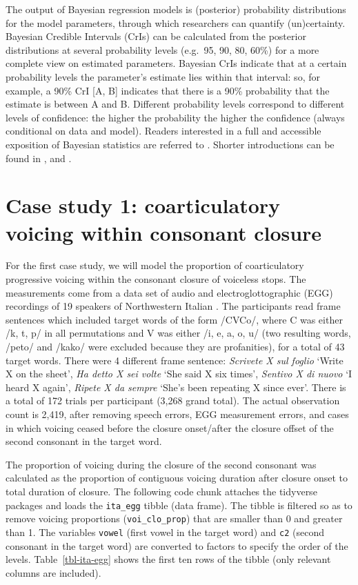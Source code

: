 \documentclass[
  authoryear,
  preprint,
  3p]{elsarticle}
\begin{document}
The output of Bayesian regression models is (posterior) probability
distributions for the model parameters, through which researchers can
quantify (un)certainty. Bayesian Credible Intervals (CrIs) can be
calculated from the posterior distributions at several probability
levels (e.g.~95, 90, 80, 60\%) for a more complete view on estimated
parameters. Bayesian CrIs indicate that at a certain probability levels
the parameter's estimate lies within that interval: so, for example, a
90\% CrI {[}A, B{]} indicates that there is a 90\% probability that the
estimate is between A and B. Different probability levels correspond to
different levels of confidence: the higher the probability the higher
the confidence (always conditional on data and model). Readers
interested in a full and accessible exposition of Bayesian statistics
are referred to \citet{mcelreath2019}. Shorter introductions can be
found in \citet{etz2018}, \citet{vasishth2018} and
\citet{nalborczyk2019}.

\section{Case study 1: coarticulatory voicing within consonant
closure}\label{sec-case-1}

For the first case study, we will model the proportion of coarticulatory
progressive voicing within the consonant closure of voiceless stops. The
measurements come from a data set of audio and electroglottographic
(EGG) recordings of 19 speakers of Northwestern Italian
\citep{coretta2019k, coretta2020b}. The participants read frame
sentences which included target words of the form /CVCo/, where C was
either /k, t, p/ in all permutations and V was either /i, e, a, o, u/
(two resulting words, /peto/ and /kako/ were excluded because they are
profanities), for a total of 43 target words. There were 4 different
frame sentence: \emph{Scrivete X sul foglio} `Write X on the sheet',
\emph{Ha detto X sei volte} `She said X six times', \emph{Sentivo X di
nuovo} `I heard X again', \emph{Ripete X da sempre} `She's been
repeating X since ever'. There is a total of 172 trials per participant
(3,268 grand total). The actual observation count is 2,419, after
removing speech errors, EGG measurement errors, and cases in which
voicing ceased before the closure onset/after the closure offset of the
second consonant in the target word.

The proportion of voicing during the closure of the second consonant was
calculated as the proportion of contiguous voicing duration after
closure onset to total duration of closure. The following code chunk
attaches the tidyverse packages \citep[for reading and wrangling
data,][]{wickham2019} and loads the \texttt{ita\_egg} tibble (data
frame). The tibble is filtered so as to remove voicing proportions
(\texttt{voi\_clo\_prop}) that are smaller than 0 and greater than 1.
The variables \texttt{vowel} (first vowel in the target word) and
\texttt{c2} (second consonant in the target word) are converted to
factors to specify the order of the levels. Table~\ref{tbl-ita-egg}
shows the first ten rows of the tibble (only relevant columns are
included).
\end{document}
